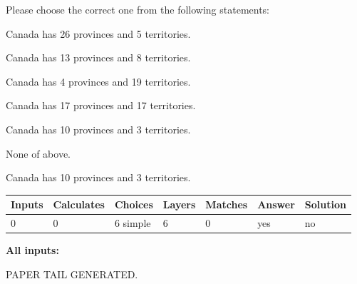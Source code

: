 \documentclass[12pt]{article}
\begin{document}
  
Please choose the correct one from the following statements:
 
 
Canada has  26 provinces and  5 territories.
 
 
Canada has  13 provinces and  8 territories.
 
 
Canada has   4 provinces and  19 territories.
 
 
Canada has  17 provinces and  17 territories.
 
 
Canada has 10  provinces and 3 territories.
 
 
 None of above.
 
 
\noindent{}
 
 
Canada has 10  provinces and 3 territories.
 
 
\noindent{}
 
 
   
   
   
   
\noindent\begin{tabular}{|l|l|l|l|l|l|l|}
 \hline
Inputs & Calculates & Choices & Layers & Matches & Answer & Solution \\ \hline
 0  & 
 0  & 
 6
  simple  
  & 
 6  & 
 0  & 
  yes & 
  no 
  \\ \hline
 \end{tabular}
   
   
   
   
\noindent{}
   
   
   
   
\noindent\vspace{0.1in}\hspace{-0.08in} {\textbf{\Large{All inputs: }}}
   
   
   
   
   
   
 \vspace{0.2in}
 
   
   
\vspace{2.0in} PAPER TAIL GENERATED.
   
   
   
\end{document}
